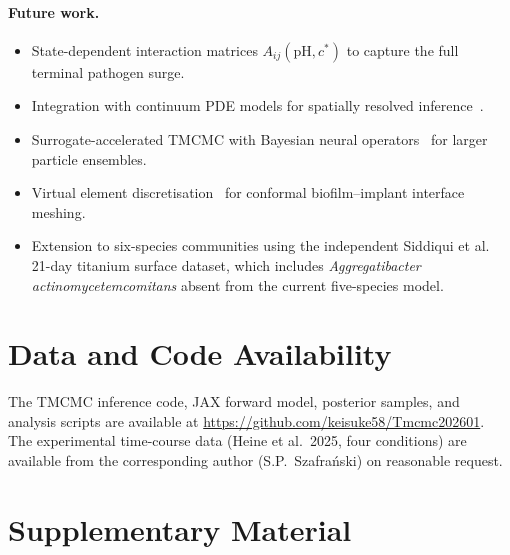 \documentclass[11pt,a4paper]{article}
\begin{document}
\paragraph{Future work.}
\begin{itemize}[nosep,leftmargin=*]
\item State-dependent interaction matrices $A_{ij}(\mathrm{pH},c^*)$ to capture the full terminal pathogen surge.
\item Integration with continuum PDE models for spatially resolved inference~\cite{Klempt2025ContinuumBiofilm}.
\item Surrogate-accelerated TMCMC with Bayesian neural operators~\cite{AlphaVIDeepONet2025} for larger particle ensembles.
\item Virtual element discretisation~\cite{Klempt2024ContinuumGrowth} for conformal biofilm--implant interface meshing.
\item Extension to six-species communities using the independent Siddiqui et al.~\cite{Siddiqui2021Biofilm} 21-day titanium surface dataset, which includes \textit{Aggregatibacter actinomycetemcomitans} absent from the current five-species model.
\end{itemize}

\section*{Data and Code Availability}
The TMCMC inference code, JAX forward model, posterior samples, and analysis scripts
are available at \url{https://github.com/keisuke58/Tmcmc202601}.
The experimental time-course data (Heine et al.\ 2025, four conditions) are available
from the corresponding author (S.P.\ Szafra\'{n}ski) on reasonable request.




\newpage
\appendix
\section*{Supplementary Material}
\end{document}
